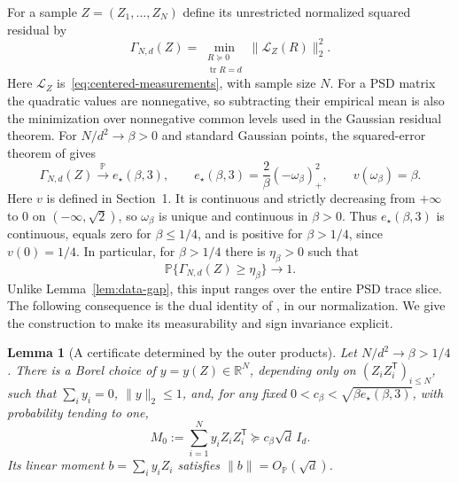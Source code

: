 \documentclass[11pt]{article}
\newcommand{\R}{\mathbb R}
\newcommand{\Pbb}{\mathbb P}
\DeclareMathOperator{\tr}{tr}
\newcommand{\norm}[1]{\lVert#1\rVert}
\newcommand{\OP}{O_{\Pbb}}
\newtheorem{lemma}[theorem]{Lemma}
\theoremstyle{remark}
\begin{document}
For a sample $Z=(Z_1,\ldots,Z_N)$ define its unrestricted normalized
squared residual by
\begin{equation}\label{eq:psd-residual}
 \Gamma_{N,d}(Z)=
 \min_{\substack{R\succeq0\\\tr R=d}}
       \norm{\mathcal L_Z(R)}_2^2.
\end{equation}
Here $\mathcal L_Z$ is~\eqref{eq:centered-measurements}, with sample
size $N$. For a PSD matrix the quadratic values are nonnegative, so
subtracting their empirical mean is also the minimization over
nonnegative common levels used in the Gaussian residual theorem.
For $N/d^2\to\beta>0$ and standard Gaussian points, the squared-error
theorem of \citet[Theorems 1.2 and 1.7]{KoehlerSohn2026} gives
\begin{equation}\label{eq:gaussian-error-limit}
 \Gamma_{N,d}(Z)\xrightarrow{\Pbb}e_\star(\beta,3),\qquad
 e_\star(\beta,3)=\frac{2}{\beta}(-\omega_\beta)_+^2,
 \qquad v(\omega_\beta)=\beta.
\end{equation}
Here $v$ is defined in Section~1. It is continuous and strictly
decreasing from $+\infty$ to $0$ on $(-\infty,\sqrt2)$, so
$\omega_\beta$ is unique and continuous in $\beta>0$.
Thus $e_\star(\beta,3)$ is continuous, equals zero for
$\beta\le1/4$, and is positive for $\beta>1/4$, since $v(0)=1/4$.
In particular, for $\beta>1/4$ there is $\eta_\beta>0$ such that
\begin{equation}\label{eq:psd-gaussian-gap}
 \Pbb\{\Gamma_{N,d}(Z)\ge\eta_\beta\}\longrightarrow1.
\end{equation}
Unlike Lemma~\ref{lem:data-gap}, this input ranges over the entire PSD
trace slice. The following consequence is the dual identity of
\citet[Proposition A.1]{KoehlerSohn2026}, in our normalization. We give
the construction to make its measurability and sign invariance explicit.

\begin{lemma}[A certificate determined by the outer products]
\label{lem:psd-certificate}
Let $N/d^2\to\beta>1/4$. There is a Borel choice of
$y=y(Z)\in\R^N$, depending only on $(Z_iZ_i^{\mathsf T})_{i\le N}$,
such that $\sum_i y_i=0$, $\norm y_2\le1$, and, for any fixed
$0<c_\beta<\sqrt{\beta e_\star(\beta,3)}$, with probability tending to one,
\begin{equation}\label{eq:certificate-margin}
 M_0:=\sum_{i=1}^N y_iZ_iZ_i^{\mathsf T}
       \succeq c_\beta\sqrt d\,I_d.
\end{equation}
Its linear moment $b=\sum_i y_iZ_i$ satisfies
$\norm b=\OP(\sqrt d)$.
\end{lemma}
\end{document}
